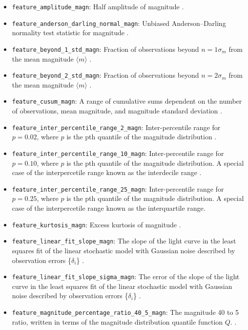 \documentclass[twocolumn]{aastex63}
\begin{document}
\begin{itemize}
    \item \texttt{feature\_amplitude\_magn}: Half amplitude of magnitude \citep{Malanchev2021}.
    \item \texttt{feature\_anderson\_darling\_normal\_magn}: Unbiased Anderson–Darling normality test statistic for magnitude \citep{Malanchev2021}.
    \item \texttt{feature\_beyond\_1\_std\_magn}: Fraction of observations beyond $n=1 \sigma_{m}$ from the mean magnitude $\langle m \rangle$ \citep{D'Isanto2016}.
    \item \texttt{feature\_beyond\_2\_std\_magn}: Fraction of observations beyond $n=2 \sigma_{m}$ from the mean magnitude $\langle m \rangle$ \citep{D'Isanto2016}.
    \item \texttt{feature\_cusum\_magn}: A range of cumulative sums dependent on the number of observations, mean magnitude, and magnitude standard deviation \citep{Kim2014}.
    \item \texttt{feature\_inter\_percentile\_range\_2\_magn}: Inter-percentile range for $p=0.02$, where $p$ is the pth quantile of the magnitude distribution \citep{Malanchev2021}.
    \item \texttt{feature\_inter\_percentile\_range\_10\_magn}: Inter-percentile range for $p=0.10$, where $p$ is the pth quantile of the magnitude distribution. A special case of the interpercetile range known as the interdecile range \citep{Malanchev2021}.
    \item \texttt{feature\_inter\_percentile\_range\_25\_magn}: Inter-percentile range for $p=0.25$, where $p$ is the pth quantile of the magnitude distribution. A special case of the interpercetile range known as the interquartile range\citep{Malanchev2021}.
    \item \texttt{feature\_kurtosis\_magn}: Excess kurtosis of magnitude \citep{Malanchev2021}.
    \item \texttt{feature\_linear\_fit\_slope\_magn}: The slope of the light curve in the least squares fit of the linear stochastic model with Gaussian noise described by observation errors \{$\delta_{i}$\} \citep{Malanchev2021}.
    \item \texttt{feature\_linear\_fit\_slope\_sigma\_magn}: The error of the slope of the light curve in the least squares fit of the linear stochastic model with Gaussian noise described by observation errors \{$\delta_{i}$\} \citep{Malanchev2021}.
    \item \texttt{feature\_magnitude\_percentage\_ratio\_40\_5\_magn}: The magnitude 40 to 5 ratio, written in terms of the magnitude distribution quantile function $Q$. \citep{D'Isanto2016}.

\end{itemize}
\end{document}
